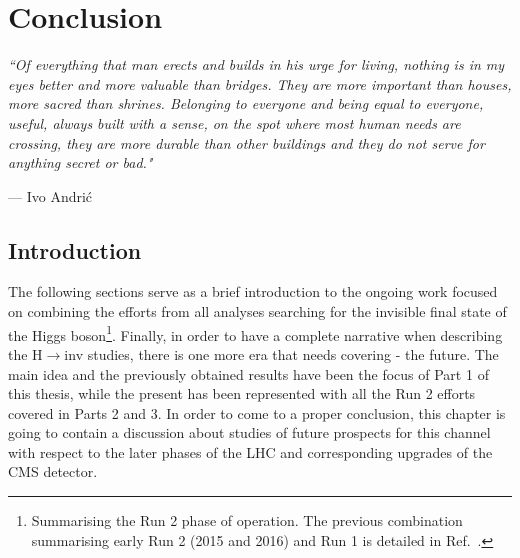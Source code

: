 \chapter{Conclusion}
\label{ch:conclusion}
\epigraph{\itshape``Of everything that man erects and builds in his urge for living, nothing is in my eyes better and more valuable than bridges. They are more important than houses, more sacred than shrines. Belonging to everyone and being equal to everyone, useful, always built with a sense, on the spot where most human needs are crossing, they are more durable than other buildings and they do not serve for anything secret or bad."}{--- \textup{Ivo Andri\' c}}

\section{Introduction}
\hspace{10pt} The following sections serve as a brief introduction to the ongoing work focused on combining the efforts from all analyses searching for the invisible final state of the Higgs boson\footnote{Summarising the Run 2 phase of operation. The previous combination summarising early Run 2 (2015 and 2016) and Run 1 is detailed in Ref.~\cite{paper:HIG_17_023}.}. %
Finally, in order to have a complete narrative when describing the H$\rightarrow$inv studies, there is one more era that needs covering - the future. The main idea and the previously obtained results have been the focus of Part 1 of this thesis, while the present has been represented with all the Run 2 efforts covered in Parts 2 and 3. In order to come to a proper conclusion, this chapter is going to contain a discussion about studies of future prospects for this channel with respect to the later phases of the LHC and corresponding upgrades of the CMS detector.


